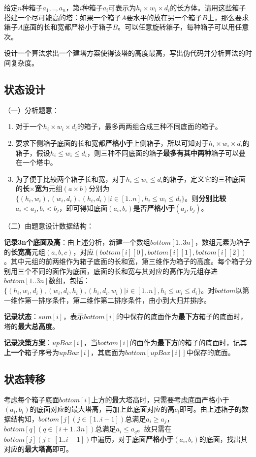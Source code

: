 \documentclass{article}
\begin{document}
给定$n$种箱子$a_1,.. ,a_n$，第$i$种箱子$a_i$可表示为$h_i\times w_i\times d_i$的长方体。请用这些箱子搭建一个尽可能高的塔：如果一个箱子$A$要水平的放在另一个箱子$B$上，那么要求箱子$A$底面的长和宽都严格小于箱子$B$。可以任意旋转箱子，每种箱子可以用任意次。

设计一个算法求出一个建塔方案使得该塔的高度最高，写出伪代码并分析算法的时间复杂度。


\subsection{状态设计}
（一）分析题意：
\begin{enumerate}
\item 对于一个$h_i\times w_i\times d_i$的箱子，最多两两组合成三种不同底面的箱子。
\item 要求下侧箱子底面的长和宽都\textbf{严格小于}上侧箱子，所以可知对于$h_i\times w_i\times d_i$的箱子，假设$h_i\leq w_i\leq d_i$，则三种不同底面的箱子\textbf{最多有其中两种}箱子可以叠在一个塔中。
\item 为了便于比较两个箱子长和宽，对于$h_i\leq w_i\leq d_i$的箱子，定义它的三种底面的\textbf{长}$\times$\textbf{宽}为元组$(a\times b)$分别为$\{(h_i,w_i),(w_i,d_i),(h_i,d_i)|i\in [1..n],h_i\leq w_i\leq d_i\}$。则\textbf{分别比较}$a_i<a_j,b_i<b_j$，即可得知底面$(a_i,b_i)$是否\textbf{严格小于}$(a_j,b_j)$。


\end{enumerate}

（二）由题意设计数据结构：

\textbf{记录3n个底面及高}：由上述分析，新建一个数组$bottom[1..3n]$，数组元素为箱子的\textbf{长宽高}元组$(a,b,c)$，对应$(bottom[i][0],bottom[i][1],bottom[i][2])$。其中元组的前两维作为箱子底面的长和宽，第三维作为箱子的高度。每个箱子分别用三个不同的面作为底面，底面的长和宽与其对应的高作为元组存进$bottom[1..3n]$数组，包括：$\{(h_i,w_i,d_i),(w_i,d_i,h_i),(h_i,d_i,w_i)|i\in [1..n],h_i\leq w_i\leq d_i\}$。对$bottom$以第一维作第一排序条件，第二维作第二排序条件，由小到大归并排序。

\textbf{记录状态}：$sum[i]$，表示$bottom[i]$的中保存的底面作为\textbf{最下方}箱子的底面时，塔的\textbf{最大总高度}。

\textbf{记录决策方案}：$upBox[i]$，当$bottom[i]$的面作为\textbf{最下方}的箱子的底面时，记其\textbf{上一个}箱子序号为$upBox[i]$，其底面为$bottom[upBox[i]]$中保存的底面。

\subsection{状态转移}
考虑每个箱子底面$bottom[i]$上方的最大塔高时，只需要考虑底面严格小于$(a_i,b_i)$的底面对应的最大塔高，再加上此底面对应的高$c_i$即可。由上述箱子的数据结构知，$bottom[j](j\in [1..i-1])$总满足$a_i\geq a_j$，$bottom[q](q\in [i+1..3n])$总满足$a_i\leq a_q$。故只需在$bottom[j](j\in [1..i-1])$中遍历，对于底面\textbf{严格小于}$(a_i,b_i)$的底面，找出其对应的\textbf{最大塔高}即可。
\end{document}

